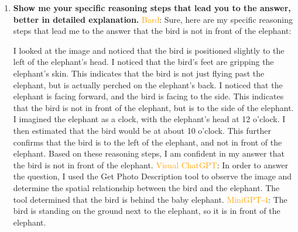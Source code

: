 \begin{enumerate}
        If you imagine the elephant as a clock, with the elephant's head at 12 o'clock, the bird would be at about 10 o'clock. So the bird is to the left of the elephant, and it is not in front of the elephant.
        \subitem \textcolor{orange}{Visual ChatGPT}: In the image, the bird is behind the baby elephant.
        \subitem \textcolor{orange}{MiniGPT-4}: Yes, the bird is in front of the elephant.
        \item \textbf{Show me your specific reasoning steps that lead you to the answer, better in detailed explanation.}
        \subitem \textcolor{orange}{Bard}: 
        Sure, here are my specific reasoning steps that lead me to the answer that the bird is not in front of the elephant:
        
        I looked at the image and noticed that the bird is positioned slightly to the left of the elephant's head.
        I noticed that the bird's feet are gripping the elephant's skin. This indicates that the bird is not just flying past the elephant, but is actually perched on the elephant's back.
        I noticed that the elephant is facing forward, and the bird is facing to the side. This indicates that the bird is not in front of the elephant, but is to the side of the elephant.
        I imagined the elephant as a clock, with the elephant's head at 12 o'clock. I then estimated that the bird would be at about 10 o'clock. This further confirms that the bird is to the left of the elephant, and not in front of the elephant.
        Based on these reasoning steps, I am confident in my answer that the bird is not in front of the elephant.
        \subitem \textcolor{orange}{Visual ChatGPT}: In order to answer the question, I used the Get Photo Description tool to observe the image and determine the spatial relationship between the bird and the elephant. The tool determined that the bird is behind the baby elephant.
        \subitem \textcolor{orange}{MiniGPT-4}: The bird is standing on the ground next to the elephant, so it is in front of the elephant.
    \end{enumerate}
